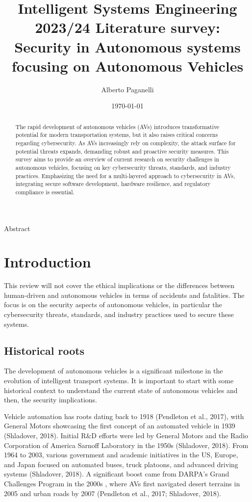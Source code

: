 \documentclass{scrartcl}
\title{\LARGE
Intelligent Systems Engineering 2023/24 \newline
\newline
Literature survey: \\
Security in Autonomous systems focusing on Autonomous Vehicles
}
\author{
    Alberto Paganelli \\ \emailaddr{alberto.paganelli3@studio.unibo.it}
}
\date{\today}
\begin{document}
    \maketitle
    Abstract
    \begin{abstract}
        The rapid development of autonomous vehicles (AVs)
        introduces transformative potential for modern transportation systems,
        but it also raises critical concerns regarding cybersecurity.
        As AVs increasingly rely on complexity, the attack surface for potential threats expands,
        demanding robust and proactive security measures.
        This survey aims to provide an overview of current research on security challenges in autonomous vehicles,
        focusing on key cybersecurity threats, standards, and industry practices.
        Emphasizing the need for a multi-layered approach to cybersecurity in AVs,
        integrating secure software development, hardware resilience, and regulatory compliance is essential.
    \end{abstract}

    \newpage

    \tableofcontents

    \newpage

    \section{Introduction}\label{sec:introduction}

    This review will not cover the ethical implications or the differences between human-driven and autonomous vehicles in terms of accidents and fatalities.
    The focus is on the security aspects of autonomous vehicles, in particular the cybersecurity threats, standards, and industry practices used to secure these systems.

    \subsection{Historical roots}\label{subsec:historical-roots}

    The development of autonomous vehicles is a significant milestone in the evolution of intelligent transport systems.
    It is important to start with some historical context to understand the current state of autonomous vehicles and then,
    the security implications.

    Vehicle automation has roots dating back to 1918 (Pendleton et al., 2017),
    with General Motors showcasing the first concept of an automated vehicle in 1939 (Shladover, 2018).
    Initial R\&D efforts were led by General Motors and the Radio Corporation of America Sarnoff Laboratory in the 1950s
    (Shladover, 2018).
    From 1964 to 2003, various government and academic initiatives in the US, Europe,
    and Japan focused on automated buses, truck platoons, and advanced driving systems
    (Shladover, 2018).
    A significant boost came from DARPA’s Grand Challenges Program in the 2000s \cite{darpa_grand_challenges_book},
    where AVs first navigated desert terrains in 2005 and urban roads by 2007 (Pendleton et al., 2017; Shladover, 2018).
\end{document}

